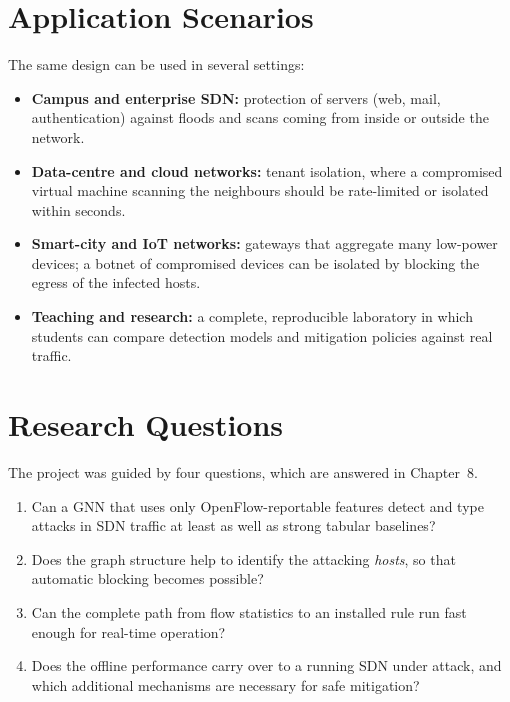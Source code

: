 \section{Application Scenarios}
The same design can be used in several settings:
\begin{itemize}
	\item \textbf{Campus and enterprise SDN:} protection of servers (web, mail, authentication) against floods and scans coming from inside or outside the network.
	\item \textbf{Data-centre and cloud networks:} tenant isolation, where a compromised virtual machine scanning the neighbours should be rate-limited or isolated within seconds.
	\item \textbf{Smart-city and IoT networks:} gateways that aggregate many low-power devices; a botnet of compromised devices can be isolated by blocking the egress of the infected hosts.
	\item \textbf{Teaching and research:} a complete, reproducible laboratory in which students can compare detection models and mitigation policies against real traffic.
\end{itemize}

\section{Research Questions}
The project was guided by four questions, which are answered in Chapter~8.
\begin{enumerate}
	\item[\textbf{RQ1}] Can a GNN that uses only OpenFlow-reportable features detect and type attacks in SDN traffic at least as well as strong tabular baselines?
	\item[\textbf{RQ2}] Does the graph structure help to identify the attacking \emph{hosts}, so that automatic blocking becomes possible?
	\item[\textbf{RQ3}] Can the complete path from flow statistics to an installed rule run fast enough for real-time operation?
	\item[\textbf{RQ4}] Does the offline performance carry over to a running SDN under attack, and which additional mechanisms are necessary for safe mitigation?
\end{enumerate}

